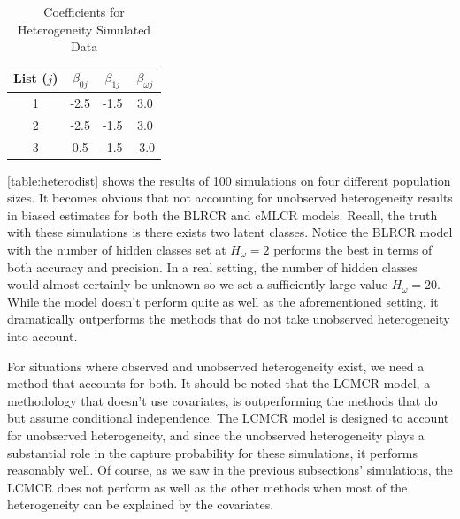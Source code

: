 \documentclass[
  12pt,
]{article}
\begin{document}
\begin{table}[H]
\centering
\begin{tabular}{||c c c c||} 
 \hline
 List ($j$) & $\beta_{0j}$ & $\beta_{1j}$ & $\beta_{\omega j}$   \\ [0.5ex] 
 \hline\hline
 1 & -2.5 &  -1.5  & 3.0 \\ 
 2 & -2.5 & -1.5  &  3.0 \\
 3 & 0.5 & -1.5  &  -3.0 \\
 \hline
\end{tabular}
\caption{Coefficients for Heterogeneity Simulated Data}
\label{table:heterocoefs}
\end{table}

\autoref{table:heterodist} shows the results of 100 simulations on four
different population sizes. It becomes obvious that not accounting for
unobserved heterogeneity results in biased estimates for both the BLRCR
and cMLCR models. Recall, the truth with these simulations is there
exists two latent classes. Notice the BLRCR model with the number of
hidden classes set at \(H_\omega=2\) performs the best in terms of both
accuracy and precision. In a real setting, the number of hidden classes
would almost certainly be unknown so we set a sufficiently large value
\(H_\omega=20\). While the model doesn't perform quite as well as the
aforementioned setting, it dramatically outperforms the methods that do
not take unobserved heterogeneity into account.

For situations where observed and unobserved heterogeneity exist, we
need a method that accounts for both. It should be noted that the LCMCR
model, a methodology that doesn't use covariates, is outperforming the
methods that do but assume conditional independence. The LCMCR model is
designed to account for unobserved heterogeneity, and since the
unobserved heterogeneity plays a substantial role in the capture
probability for these simulations, it performs reasonably well. Of
course, as we saw in the previous subsections' simulations, the LCMCR
does not perform as well as the other methods when most of the
heterogeneity can be explained by the covariates.
\end{document}
